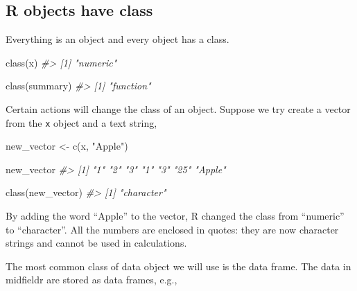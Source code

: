 \documentclass[
]{book}
\newenvironment{Shaded}{\begin{snugshade}}{\end{snugshade}}
\newcommand{\CommentTok}[1]{\textcolor[rgb]{0.56,0.35,0.01}{\textit{#1}}}
\newcommand{\FunctionTok}[1]{\textcolor[rgb]{0.00,0.00,0.00}{#1}}
\newcommand{\NormalTok}[1]{#1}
\newcommand{\OtherTok}[1]{\textcolor[rgb]{0.56,0.35,0.01}{#1}}
\newcommand{\StringTok}[1]{\textcolor[rgb]{0.31,0.60,0.02}{#1}}
\begin{document}
\hypertarget{r-objects-have-class}{%
\subsection{R objects have class}\label{r-objects-have-class}}

Everything is an object and every object has a class.

\begin{Shaded}
\begin{Highlighting}[]
\FunctionTok{class}\NormalTok{(x)}
\CommentTok{\#\textgreater{} [1] "numeric"}

\FunctionTok{class}\NormalTok{(summary)}
\CommentTok{\#\textgreater{} [1] "function"}
\end{Highlighting}
\end{Shaded}

Certain actions will change the class of an object. Suppose we try create a vector from the \texttt{x} object and a text string,

\begin{Shaded}
\begin{Highlighting}[]
\NormalTok{new\_vector }\OtherTok{\textless{}{-}} \FunctionTok{c}\NormalTok{(x, }\StringTok{"Apple"}\NormalTok{)}

\NormalTok{new\_vector}
\CommentTok{\#\textgreater{} [1] "1"     "2"     "3"     "1"     "3"     "25"    "Apple"}

\FunctionTok{class}\NormalTok{(new\_vector)}
\CommentTok{\#\textgreater{} [1] "character"}
\end{Highlighting}
\end{Shaded}

By adding the word ``Apple'' to the vector, R changed the class from ``numeric'' to ``character''. All the numbers are enclosed in quotes: they are now character strings and cannot be used in calculations.

The most common class of data object we will use is the data frame. The data in midfieldr are stored as data frames, e.g.,
\end{document}
